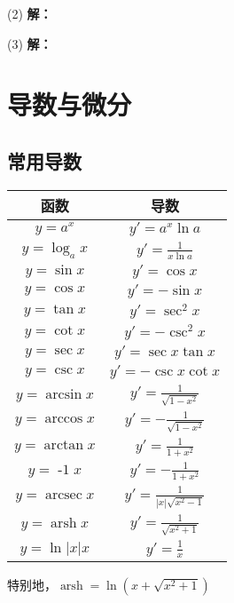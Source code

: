 \documentclass[12pt , a4paper , oneside]{ctexart}
\begin{document}
            \begin{mdframed}
            (2) \textbf{解：}
            \end{mdframed}

            \begin{mdframed}
            (3) \textbf{解：}
            \end{mdframed}
    \section{导数与微分}
        \subsection{常用导数}
        \begin{center}
            \begin{tabular}{c|c}
                \toprule
                \textbf{函数} & \textbf{导数} \\  %
                \midrule
                $y = a^x$ & $y' = a^x \ln a$ \\  %
                \midrule
                $y = \log_a x$ & $y' = \frac{1}{x \ln a}$ \\  %
                \midrule
                $y = \sin x$ & $y' = \cos x$ \\  %
                \midrule
                $y = \cos x$ & $y' = -\sin x$ \\  %
                \midrule
                $y = \tan x$ & $y' = \sec^2 x$ \\  %
                \midrule
                $y = \cot x$ & $y' = -\csc^2 x$ \\  %
                \midrule
                $y = \sec x$ & $y' = \sec x \tan x$ \\  %
                \midrule
                $y = \csc x$ & $y' = -\csc x \cot x$ \\  %
                \midrule
                $y = \arcsin x$ & $y' = \frac{1}{\sqrt{1-x^2}}$ \\  %
                \midrule
                $y = \arccos x$ & $y' = -\frac{1}{\sqrt{1-x^2}}$ \\  %
                \midrule
                $y = \arctan x$ & $y' = \frac{1}{1+x^2}$ \\  %
                \midrule
                $y = \operatorname{-1} x$ & $y' = -\frac{1}{1+x^2}$ \\  %
                \midrule
                $y = \operatorname{arcsec} x$ & $y' = \frac{1}{|x|\sqrt{x^2-1}}$ \\  %
                \midrule
                $y = \operatorname{arsh} x$ & $y' = \frac{1}{\sqrt{x^2+1}}$ \\  %
                \midrule
                $y = \ln{|x|} x$ & $y' = \frac{1}{x}$ \\  %
                \bottomrule
            \end{tabular}
            \end{center}
            特别地，$\operatorname{arsh} = \ln{(x+\sqrt{x^2+1})}$
\end{document}
